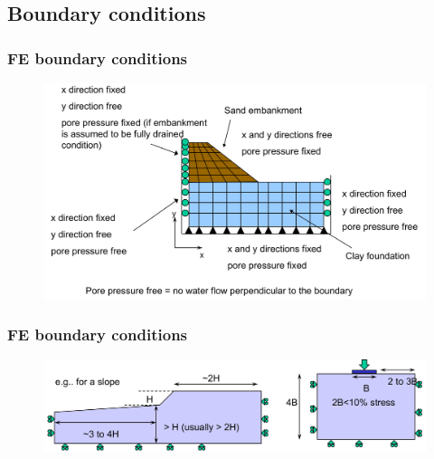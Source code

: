 \documentclass[notes]{beamer}
\begin{document}
\subsection{Boundary conditions}
\begin{frame}
\frametitle{FE boundary conditions}
\begin{figure}[ht]
	\centering
	\includegraphics[width=\textwidth]{figs/boundary-conditions.png}
\end{figure}
\end{frame}

\begin{frame}
\frametitle{FE boundary conditions}
\begin{figure}[ht]
	\centering
	\includegraphics[width=\textwidth]{figs/fe-boundaries.png}
\end{figure}
\end{frame}
\end{document}
